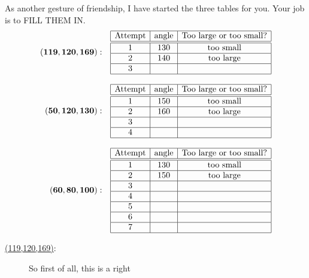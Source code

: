 \documentclass[noauthor,nooutcomes,handout]{ximera}
\begin{document}
\begin{question}
     As another gesture of friendship, I have started the three tables
     for you. Your job is to FILL THEM IN.
     \[
     \begin{array}{rl}
       \mathbf{(119,120,169):} &
        \begin{array}{|c|c|c|c|}\hline
       \text{Attempt} & \text{angle} & \text{Too large or too small?} \\ \hline\hline
       1 & 130 & \text{too small} \\ \hline
       2 & 140 & \text{too large}  \\ \hline
       3 &  &   \\ \hline
        \end{array} \\
        & \\
          \mathbf{(50,120,130):} & \begin{array}{|c|c|c|c|}\hline
            \text{Attempt} & \text{angle} & \text{Too large or too small?} \\ \hline\hline
            1 & 150 & \text{too small} \\ \hline
            2 & 160 & \text{too large}  \\ \hline
            3 &  &   \\ \hline
            4 &  &   \\ \hline
     \end{array} \\
     & \\
       \mathbf{(60,80,100):}  &
        \begin{array}{|c|c|c|c|}\hline
       \text{Attempt} & \text{angle} & \text{Too large or too small?} \\ \hline\hline
       1 & 130 & \text{too small} \\ \hline
       2 & 150 & \text{too large}  \\ \hline
       3 &  &   \\ \hline
       4 &  &   \\ \hline
       5 &  &   \\ \hline
       6 &  &   \\ \hline
       7 &  &   \\ \hline
        \end{array}
     \end{array}
     \]
     \begin{freeResponse}
       \begin{description}
       \item[\underline{(119,120,169)}:] So first of all, this is a right

\end{description}
\end{freeResponse}
\end{question}
\end{document}
